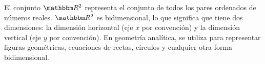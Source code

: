 \begin{example}
{\begin{center}
    \end{center}
    }
    \newpage
    El conjunto $\RR[2]$ representa el conjunto de todos los pares ordenados de números reales. $\RR[2]$ es bidimensional, lo que significa que tiene dos dimensiones: la dimensión horizontal (eje $x$ por convención) y la dimensión vertical (eje $y$ por convención). En geometría analítica, se utiliza para representar figuras geométricas, ecuaciones de rectas, círculos y cualquier otra forma bidimensional.
    

\end{example}
